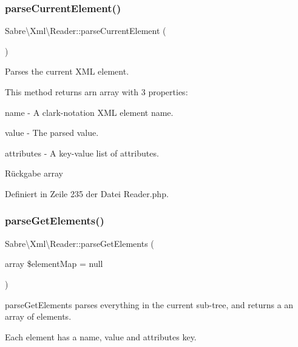 \subsubsection{\texorpdfstring{parse\+Current\+Element()}{parseCurrentElement()}}
{\footnotesize\ttfamily Sabre\textbackslash{}\+Xml\textbackslash{}\+Reader\+::parse\+Current\+Element (\begin{DoxyParamCaption}{ }\end{DoxyParamCaption})}

Parses the current X\+ML element.

This method returns arn array with 3 properties\+:
\begin{DoxyItemize}
\item name -\/ A clark-\/notation X\+ML element name.
\item value -\/ The parsed value.
\item attributes -\/ A key-\/value list of attributes.
\end{DoxyItemize}

\begin{DoxyReturn}{Rückgabe}
array 
\end{DoxyReturn}


Definiert in Zeile 235 der Datei Reader.\+php.

\mbox{\label{class_sabre_1_1_xml_1_1_reader_a1a77fcd5dbe2db9ed238f9e7afd4c6e2}} 
\subsubsection{\texorpdfstring{parse\+Get\+Elements()}{parseGetElements()}}
{\footnotesize\ttfamily Sabre\textbackslash{}\+Xml\textbackslash{}\+Reader\+::parse\+Get\+Elements (\begin{DoxyParamCaption}\item[{array}]{\$element\+Map = {\ttfamily null} }\end{DoxyParamCaption})}

parse\+Get\+Elements parses everything in the current sub-\/tree, and returns a an array of elements.

Each element has a \textquotesingle{}name\textquotesingle{}, \textquotesingle{}value\textquotesingle{} and \textquotesingle{}attributes\textquotesingle{} key.

